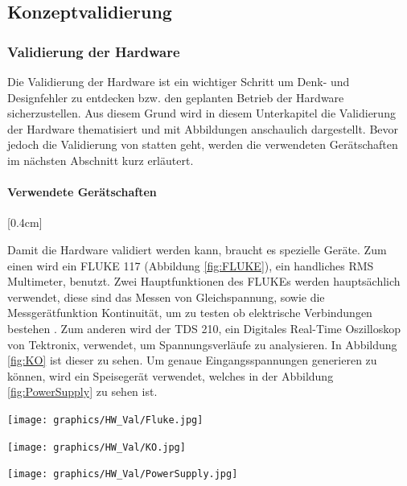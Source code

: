 \subsection{Konzeptvalidierung}
\label{subsec:Konzeptvalidierung}

\subsubsection{Validierung der Hardware}
\label{subsubsec:HW_Val}
Die Validierung der Hardware ist ein wichtiger Schritt um Denk- und Designfehler zu entdecken bzw. den geplanten Betrieb der Hardware sicherzustellen. Aus diesem Grund wird in diesem Unterkapitel die Validierung der Hardware thematisiert und mit Abbildungen anschaulich dargestellt. Bevor jedoch die Validierung von statten geht, werden die verwendeten Gerätschaften im nächsten Abschnitt kurz erläutert.\\
\paragraph{\textbf{Verwendete Gerätschaften}}[0.4cm]
{\begin{minipage}[b][9cm][t]{0.42\textwidth}
Damit die Hardware validiert werden kann, braucht es spezielle Geräte. Zum einen wird ein FLUKE 117 (Abbildung \ref{fig:FLUKE}), ein handliches RMS Multimeter, benutzt. Zwei Hauptfunktionen des FLUKEs werden hauptsächlich verwendet, diese sind das Messen von Gleichspannung, sowie die Messgerätfunktion Kontinuität, um zu testen ob elektrische Verbindungen bestehen \cite{FLUKE}. Zum anderen wird der TDS 210, ein Digitales Real-Time Oszilloskop von Tektronix, verwendet, um Spannungsverläufe zu analysieren. In Abbildung \ref{fig:KO} ist dieser zu sehen. Um genaue Eingangsspannungen generieren zu können, wird ein Speisegerät verwendet, welches in der Abbildung \ref{fig:PowerSupply} zu sehen ist.
\end{minipage}}
{\begin{minipage}[b][9cm][t]{0.57\textwidth}
\centering
\texttt{[image: graphics/HW\_Val/Fluke.jpg]}
\label{fig:FLUKE}
\end{minipage}}

{\begin{minipage}[b][7cm][t]{0.49\textwidth}
\centering
\texttt{[image: graphics/HW\_Val/KO.jpg]}
\label{fig:KO}
\end{minipage}}
{\begin{minipage}[b][7cm][t]{0.49\textwidth}
\centering
\texttt{[image: graphics/HW\_Val/PowerSupply.jpg]}
\label{fig:PowerSupply}
\end{minipage}}

